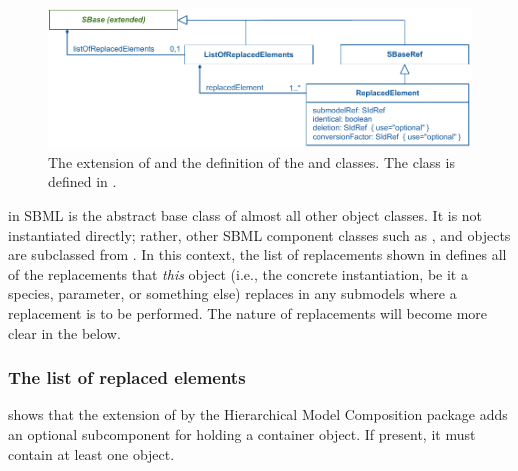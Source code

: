 \begin{figure}[hbt]
  \includegraphics{figs/extended-sbase-uml}
  \caption{The extension of \SBase and the definition of the
    \ListOfReplacedElements and \ReplacedElement classes.  The \SBaseRef
  class is defined in .}
  \label{extended-sbase-uml}
\end{figure}




\SBase in SBML is the abstract base class of almost all other object
classes.  It is not instantiated directly; rather, other SBML component
classes such as \Species, \Compartment and \Reaction objects are
subclassed from \SBase.  In this context, the list of replacements shown
in  defines all of the replacements that
\emph{this} object (i.e., the concrete instantiation, be it a species,
parameter, or something else) replaces in any submodels where a
replacement is to be performed.  The nature of replacements will become
more clear in the  below.


\subsubsection{The list of replaced elements}

 shows that the extension of \SBase by the
Hierarchical Model Composition package adds an optional
 subcomponent for holding a
\ListOfReplacedElements container object.  If present, it must contain
at least one \ReplacedElement object.


